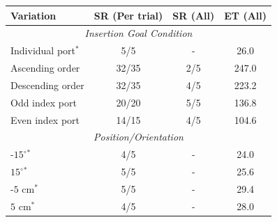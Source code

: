 \scriptsize
\setlength{\tabcolsep}{4pt}
\renewcommand{\arraystretch}{0.95}
\begin{tabular}{lccc}
\toprule
\textbf{Variation} & \textbf{SR (Per trial)} & \textbf{SR (All)} & \textbf{ET (All)} \\
\midrule
\multicolumn{4}{c}{\textit{Insertion Goal Condition}} \\
\midrule
Individual port$^*$ & 5/5   & -   & 26.0 \\
Ascending order     & 32/35 & 2/5 & 247.0 \\
Descending order    & 32/35 & 4/5 & 223.2 \\
Odd index port      & 20/20 & 5/5 & 136.8 \\
Even index port     & 14/15 & 4/5 & 104.6 \\
\midrule
\multicolumn{4}{c}{\textit{Position/Orientation}} \\
\midrule
-$15^\circ$$^*$     & 4/5   & -   & 24.0 \\
$15^\circ$$^*$      & 5/5   & -   & 25.6 \\
-$5$ cm$^*$         & 5/5   & -   & 29.4 \\
$5$ cm$^*$          & 4/5   & -   & 28.0 \\
\bottomrule
\end{tabular}
